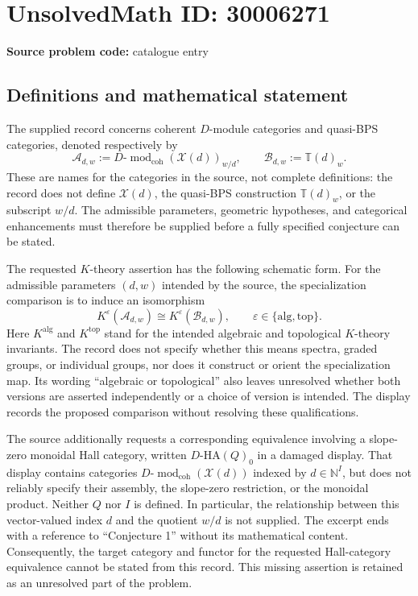 \documentclass[11pt]{article}
\newcommand{\N}{\mathbb{N}}
\begin{document}
\section*{UnsolvedMath ID: 30006271}
\textbf{Source problem code:} catalogue entry
\subsection{Definitions and mathematical statement}
The supplied record concerns coherent \(D\)-module categories and quasi-BPS categories, denoted respectively by
\[
\mathcal A_{d,w}:=D\text{-}\operatorname{mod}_{\mathrm{coh}}(\mathcal X(d))_{w/d},
\qquad
\mathcal B_{d,w}:=\mathbb T(d)_w.
\]
These are names for the categories in the source, not complete definitions: the record does not define \(\mathcal X(d)\), the quasi-BPS construction \(\mathbb T(d)_w\), or the subscript \(w/d\). The admissible parameters, geometric hypotheses, and categorical enhancements must therefore be supplied before a fully specified conjecture can be stated.

The requested \(K\)-theory assertion has the following schematic form. For the admissible parameters \((d,w)\) intended by the source, the specialization comparison is to induce an isomorphism
\[
K^{\varepsilon}(\mathcal A_{d,w})
\cong
K^{\varepsilon}(\mathcal B_{d,w}),
\qquad
\varepsilon\in\{\mathrm{alg},\mathrm{top}\}.
\]
Here \(K^{\mathrm{alg}}\) and \(K^{\mathrm{top}}\) stand for the intended algebraic and topological \(K\)-theory invariants. The record does not specify whether this means spectra, graded groups, or individual groups, nor does it construct or orient the specialization map. Its wording ``algebraic or topological'' also leaves unresolved whether both versions are asserted independently or a choice of version is intended. The display records the proposed comparison without resolving these qualifications.

The source additionally requests a corresponding equivalence involving a slope-zero monoidal Hall category, written \(D\text{-}\mathrm{HA}(Q)_0\) in a damaged display. That display contains categories \(D\text{-}\operatorname{mod}_{\mathrm{coh}}(\mathcal X(d))\) indexed by \(d\in\N^I\), but does not reliably specify their assembly, the slope-zero restriction, or the monoidal product. Neither \(Q\) nor \(I\) is defined. In particular, the relationship between this vector-valued index \(d\) and the quotient \(w/d\) is not supplied. The excerpt ends with a reference to ``Conjecture 1'' without its mathematical content. Consequently, the target category and functor for the requested Hall-category equivalence cannot be stated from this record. This missing assertion is retained as an unresolved part of the problem.
\end{document}

